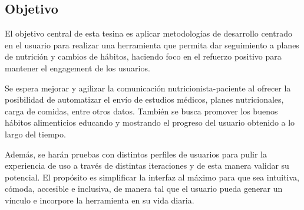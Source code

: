 \subsection{Objetivo}
\label{objetivo}

El objetivo central de esta tesina es aplicar metodologías de desarrollo centrado en el usuario para realizar una herramienta que permita dar seguimiento a planes de nutrición y cambios de hábitos, haciendo foco en el refuerzo positivo para mantener el engagement de los usuarios.

Se espera mejorar y agilizar la comunicación nutricionista-paciente al ofrecer la posibilidad de automatizar el envío de estudios médicos, planes nutricionales, carga de comidas, entre otros datos. También se busca promover los buenos hábitos alimenticios educando y mostrando el progreso del usuario obtenido a lo largo del tiempo. 

Además, se harán pruebas con distintos perfiles de usuarios para pulir la experiencia de uso a través de distintas iteraciones y de esta manera validar su potencial. El propósito es simplificar la interfaz al máximo para que sea intuitiva, cómoda, accesible e inclusiva, de manera tal que el usuario pueda generar un vínculo e incorpore la herramienta en su vida diaria.
